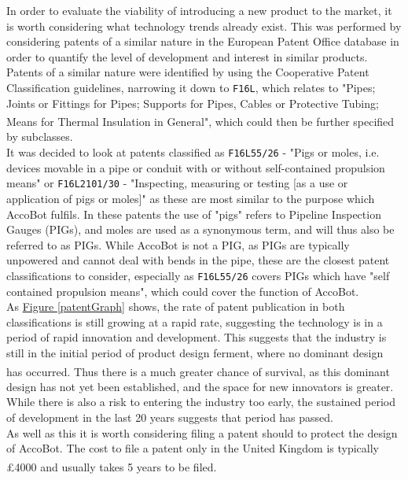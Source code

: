 \documentclass[11pt]{article}		%
\newcommand{\supercite}[1]{\textsuperscript{\cite{#1}}}		%
\newcommand{\figref}[1]{\hyperref[#1]{Figure \ref*{#1}}}    %
\begin{document}
        In order to evaluate the viability of introducing a new product to the market, it is worth considering what technology trends already exist.
        This was performed by considering patents of a similar nature in the European Patent Office database in order to quantify the level of development and interest in similar products.
        Patents of a similar nature were identified by using the Cooperative Patent Classification guidelines, narrowing it down to \verb|F16L|, which relates to "Pipes; Joints or Fittings for Pipes; Supports for Pipes, Cables or Protective Tubing; Means for Thermal Insulation in General"\supercite{cpcSearch}, which could then be further specified by subclasses.
        \\
        \hspace*{2ex}It was decided to look at patents classified as \verb|F16L55/26| - "Pigs or moles, i.e. devices movable in a pipe or conduit with or without self-contained propulsion means" or \verb|F16L2101/30| - "Inspecting, measuring or testing [as a use or application of pigs or moles]" as these are most similar to the purpose which AccoBot fulfils.
		In these patents the use of "pigs" refers to Pipeline Inspection Gauges (PIGs), and moles are used as a synonymous term, and will thus also be referred to as PIGs.
		While AccoBot is not a PIG, as PIGs are typically unpowered and cannot deal with bends in the pipe, these are the closest patent classifications to consider, especially as \verb|F16L55/26| covers PIGs which have "self contained propulsion means", which could cover the function of AccoBot.
		\\
        \hspace*{2ex}As \figref{patentGraph} shows, the rate of patent publication in both classifications is still growing at a rapid rate, suggesting the technology is in a period of rapid innovation and development.
		This suggests that the industry is still in the initial period of product design ferment, where no dominant design has occurred\supercite{christensen1998innovation}.
		Thus there is a much greater chance of survival, as this dominant design has not yet been established, and the space for new innovators is greater.
		While there is also a risk to entering the industry too early, the sustained period of development in the last 20 years suggests that period has passed.
		\\
        \hspace*{2ex}As well as this it is worth considering filing a patent should to protect the design of AccoBot.
		The cost to file a patent only in the United Kingdom is typically £4000 and usually takes 5 years to be filed\supercite{uk2020patenting}.
\end{document}

